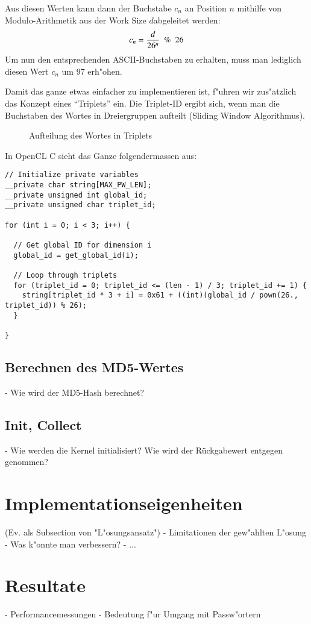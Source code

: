 \begin{refsection}
\noindent Aus diesen Werten kann dann der Buchstabe $c_n$ an Position $n$ mithilfe von
Modulo-Arithmetik aus der Work Size $d$abgeleitet werden:
\[
	c_n = \frac{d}{26^n} \enskip\%\enskip 26
\]
Um nun den entsprechenden ASCII-Buchstaben zu erhalten, muss man lediglich
diesen Wert $c_n$ um 97 erh"ohen.

Damit das ganze etwas einfacher zu implementieren ist, f"uhren wir zus"atzlich
das Konzept eines ``Triplets'' ein. Die Triplet-ID ergibt sich, wenn man die
Buchstaben des Wortes in Dreiergruppen aufteilt (Sliding Window Algorithmus).

\begin{figure}[H]
	\centering
	
	\caption{Aufteilung des Wortes in Triplets}
	\label{img:crypto:triplets}
\end{figure}

\noindent In OpenCL C sieht das Ganze folgendermassen aus:

\begin{small}
\begin{verbatim}
// Initialize private variables
__private char string[MAX_PW_LEN];
__private unsigned int global_id;
__private unsigned char triplet_id;

for (int i = 0; i < 3; i++) {

  // Get global ID for dimension i
  global_id = get_global_id(i);

  // Loop through triplets
  for (triplet_id = 0; triplet_id <= (len - 1) / 3; triplet_id += 1) {
    string[triplet_id * 3 + i] = 0x61 + ((int)(global_id / pown(26., triplet_id)) % 26);
  }

}
\end{verbatim}
\end{small}

\subsection{Berechnen des MD5-Wertes}

- Wie wird der MD5-Hash berechnet?

\subsection{Init, Collect}

- Wie werden die Kernel initialisiert? Wie wird der Rückgabewert entgegen
genommen?

\section{Implementationseigenheiten}

(Ev. als Subsection von "L"osungsansatz")
- Limitationen der gew"ahlten L"osung
- Was k"onnte man verbessern?
- ...

\section{Resultate}

- Performancemessungen
- Bedeutung f"ur Umgang mit Passw"ortern

\printbibliography[heading=subbibliography]
\end{refsection}

